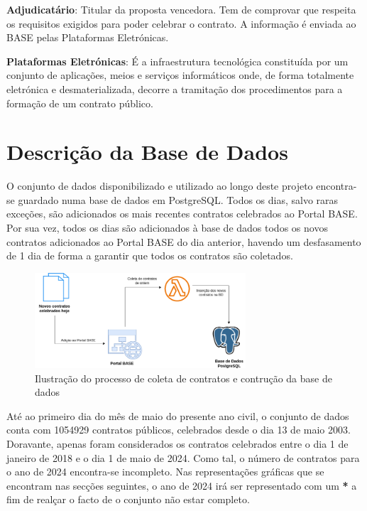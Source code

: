 \begin{my_enumerate}
	\item \textbf{Adjudicatário}: Titular da proposta vencedora. Tem de comprovar que respeita os requisitos exigidos para poder celebrar o contrato. A informação é enviada ao BASE pelas Plataformas Eletrónicas.
	
	\item \textbf{Plataformas Eletrónicas}: É a infraestrutura tecnológica constituída por um conjunto de aplicações, meios e serviços informáticos onde, de forma totalmente eletrónica e desmaterializada, decorre a tramitação dos procedimentos para a formação de um contrato público. 
\end{my_enumerate}







\section{Descrição da Base de Dados}



O conjunto de dados disponibilizado e utilizado ao longo deste projeto encontra-se guardado numa base de dados em PostgreSQL. Todos os dias, salvo raras exceções, são adicionados os mais recentes contratos celebrados ao Portal BASE. Por sua vez, todos os dias são adicionados à base de dados todos os novos contratos adicionados ao Portal BASE do dia anterior, havendo um desfasamento de 1 dia de forma a garantir que todos os contratos são coletados. 


\begin{figure}[H]
	\centering
	\includegraphics[width=0.7\textwidth]{imagens/portal_coleta.png}
	\caption{Ilustração do processo de coleta de contratos e contrução da base de dados}
	\label{fig:processocoleta}
\end{figure}


Até ao primeiro dia do mês de maio do presente ano civil, o conjunto de dados conta com 1054929 contratos públicos, celebrados desde o dia 13 de maio 2003. Doravante, apenas foram considerados os contratos celebrados entre o dia 1 de janeiro de 2018 e o dia 1 de maio de 2024. Como tal, o número de contratos para o ano de 2024 encontra-se incompleto. Nas representações gráficas que se encontram nas secções seguintes, o ano de 2024 irá ser representado com um \textbf{*} a fim de realçar o facto de o conjunto não estar completo. 

